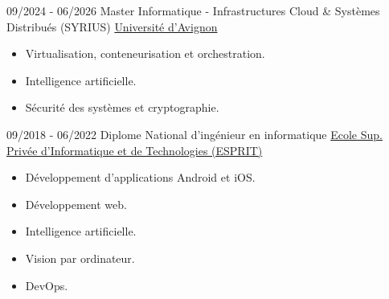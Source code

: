 \documentclass[9pt]{developercv} %
\begin{document}
\vspace{-10 pt}
\begin{entrylist}
    \entry
    {09/2024 - 06/2026}
    {Master Informatique - Infrastructures Cloud \& Systèmes Distribués (SYRIUS)
        \vspace{-10pt}
    }
    {\href{https://formations.univ-avignon.fr/formation/master-informatique-systemes-informatiques-communicants-reseaux-services-et-securite-sicom/}{Université d'Avignon}}
    {
        \begin{itemize}[noitemsep,topsep=0pt,parsep=0pt,partopsep=0pt, leftmargin=0pt]
            \item Virtualisation, conteneurisation et orchestration.
            \item Intelligence artificielle.
            \item Sécurité des systèmes et cryptographie.
        \end{itemize}
    }

    \entry
    {09/2018 - 06/2022}
    {Diplome National d'ingénieur en informatique}
    {\href{https://www.esprit.tn}{Ecole Sup. Privée d'Informatique et de Technologies (ESPRIT)}
        \vspace{-10pt}
    }
    {
        \begin{itemize}[noitemsep,topsep=0pt,parsep=0pt,partopsep=0pt, leftmargin=0pt]
            \item Développement d'applications Android et iOS.
            \item Développement web.
            \item Intelligence artificielle.
            \item Vision par ordinateur.
            \item DevOps.
        \end{itemize}
    }
\end{entrylist}
\end{document}
